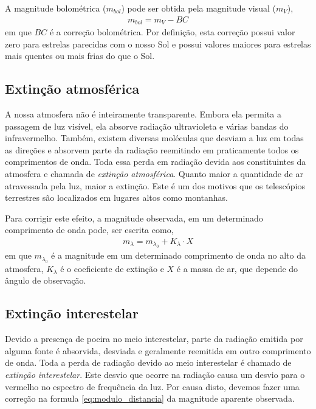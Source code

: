 A magnitude bolométrica ($m_{\si{bol}}$) pode ser obtida pela magnitude visual ($m_V$),
\begin{align}
m_{\si{bol}} = m_V - BC
\end{align}
em que $BC$ é a correção bolométrica. Por definição, esta correção possui valor zero para estrelas parecidas com o nosso Sol e possui valores maiores para estrelas mais quentes ou mais frias do que o Sol.

\subsection{Extinção atmosférica}

A nossa atmosfera não é inteiramente transparente. Embora ela permita a passagem de luz visível, ela absorve radiação ultravioleta e várias bandas do infravermelho. Também, existem diversas moléculas que desviam a luz em todas as direções e absorvem parte da radiação reemitindo em praticamente todos os comprimentos de onda. Toda essa perda em radiação devida aos constituintes da atmosfera e chamada de \textit{extinção atmosférica}. Quanto maior a quantidade de ar atravessada pela luz, maior a extinção. Este é um dos motivos que os telescópios terrestres são localizados em lugares altos como montanhas.

Para corrigir este efeito, a magnitude observada, em um determinado comprimento de onda pode, ser escrita como,
\begin{align}
m_{\lambda} = m_{\lambda_0} + K_{\lambda} \cdot X
\end{align}
em que $m_{\lambda_0}$ é a magnitude em um determinado comprimento de onda no alto da atmosfera, $K_{\lambda}$ é o coeficiente de extinção e $X$ é a massa de ar, que depende do ângulo de observação.

\subsection{Extinção interestelar}

Devido a presença de poeira no meio interestelar, parte da radiação emitida por alguma fonte é absorvida, desviada e geralmente reemitida em outro comprimento de onda. Toda a perda de radiação devido ao meio interestelar é chamado de \textit{extinção interestelar}. Este desvio que ocorre na radiação causa um desvio para o vermelho no espectro de frequência da luz. Por causa disto, devemos fazer uma correção na formula \eqref{eq:modulo_distancia} da magnitude aparente observada.

